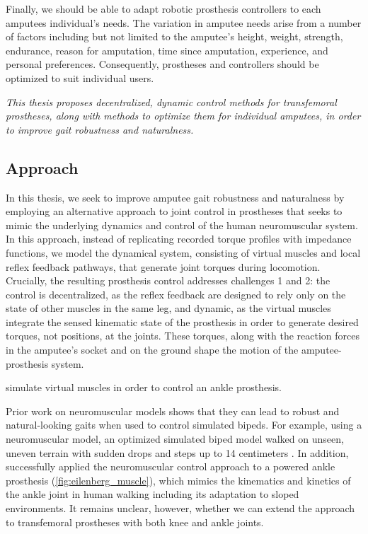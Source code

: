 Finally, we should be able to adapt robotic prosthesis controllers to each
amputees individual's needs. The variation in amputee needs arise from a number
of factors including but not limited to the amputee's height, weight, strength,
endurance, reason for amputation, time since amputation, experience, and
personal preferences. Consequently, prostheses and controllers should be
optimized to suit individual users.

\vspace{2ex}
\begin{fullwidth} \emph{This thesis proposes decentralized, dynamic control
methods for transfemoral prostheses, along with methods to optimize them for
individual amputees, in order to improve gait robustness and naturalness.}
\end{fullwidth}

\subsection{Approach}

In this thesis, we seek to improve amputee gait robustness and naturalness by
employing an alternative approach to joint control in prostheses that seeks to
mimic the underlying dynamics and control of the human neuromuscular system. In
this approach, instead of replicating recorded torque profiles with impedance
functions, we model the dynamical system, consisting of virtual muscles and
local reflex feedback pathways, that generate joint torques during locomotion.
Crucially, the resulting prosthesis control addresses challenges 1 and 2: the
control is decentralized, as the reflex feedback are designed to rely only on
the state of other muscles in the same leg, and dynamic, as the virtual muscles
integrate the sensed kinematic state of the prosthesis in order to generate
desired torques, not positions, at the joints. These torques, along with the
reaction forces in the amputee's socket and on the ground shape the motion of
the amputee-prosthesis system.
\begin{marginfigure}
    \centering
    \caption{\citet{eilenberg2010control} simulate virtual muscles in
    order to control an ankle prosthesis.}
    \label{fig:eilenberg_muscle}
\end{marginfigure}

Prior work on neuromuscular models shows that they can lead to robust and
natural-looking gaits when used to control simulated bipeds. For example, using
a neuromuscular model, an optimized simulated biped model walked on unseen,
uneven terrain with sudden drops and steps up to 14 centimeters
\citep{song2015neural}. In addition, \citet{eilenberg2010control} successfully
applied the neuromuscular control approach to a powered ankle prosthesis
(\cref{fig:eilenberg_muscle}), which mimics the kinematics and kinetics of the
ankle joint in human walking including its adaptation to sloped environments. It
remains unclear, however, whether we can extend the approach to transfemoral
prostheses with both knee and ankle joints.


